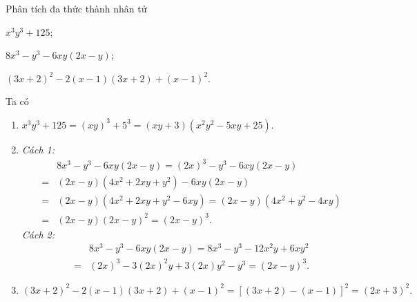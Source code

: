 \begin{vn}
	Phân tích đa thức thành nhân tử
	\begin{listEX}[2]
		\item $x^3y^3 + 125$;
		\item $8x^3 - y^3 - 6xy(2x-y)$;
		\item $(3x+2)^2 - 2(x-1)(3x+2) + (x-1)^2$.
	\end{listEX}
	\loigiai 
	{
		Ta có
		\begin{enumerate}
			\item $x^3y^3 + 125 = (xy)^3 + 5^3 = (xy+3)\left(x^2y^2 - 5xy + 25\right).$
			\item \emph{Cách 1:}
			{\allowdisplaybreaks
				\begin{eqnarray*}
					&& 8x^3 - y^3 - 6xy(2x-y) = (2x)^3 - y^3 - 6xy(2x-y) \\
					&=& (2x-y)\left(4x^2 + 2xy + y^2\right) - 6xy(2x-y) \\
					&=& (2x-y)\left(4x^2 + 2xy + y^2 - 6xy\right) = (2x-y)\left(4x^2 + y^2 - 4xy\right) \\
					&=& (2x-y)(2x-y)^2 = (2x-y)^3.
				\end{eqnarray*}
			}
				\emph{Cách 2:} 
				{\allowdisplaybreaks
					\begin{eqnarray*}
						&&8x^3 - y^3 - 6xy(2x-y) = 8x^3 - y^3 - 12x^2y + 6xy^2 \\
						&=& (2x)^3 - 3(2x)^2y + 3(2x)y^2 - y^3 = (2x-y)^3.
					\end{eqnarray*}
				}
			\item $(3x+2)^2 - 2(x-1)(3x+2) + (x-1)^2 = [(3x+2) - (x-1)]^2 = (2x+3)^2.$
		\end{enumerate}
	}
\end{vn}

